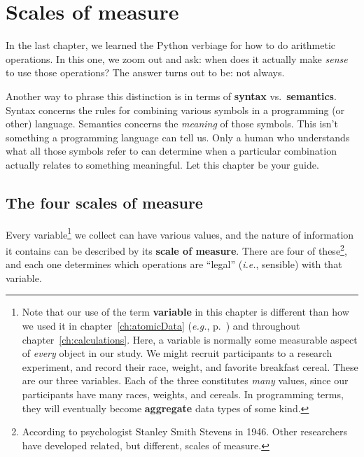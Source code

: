 


\chapter{Scales of measure}
\label{ch:scalesOfMeasure}

In the last chapter, we learned the Python verbiage for how to do arithmetic
operations. In this one, we zoom out and ask: when does it actually make
\textit{sense} to use those operations? The answer turns out to be: not always.

Another way to phrase this distinction is in terms of \textbf{syntax}
vs.~\textbf{semantics}. Syntax concerns the rules for combining various symbols
in a programming (or other) language. Semantics concerns the \textit{meaning}
of those symbols. This isn't something a programming language can tell us. Only
a human who understands what all those symbols refer to can determine when a
particular combination actually relates to something meaningful. Let this
chapter be your guide.

\section{The four scales of measure}

\label{variableDifferent}
Every variable\footnote{Note that our use of the term \textbf{variable} in this
chapter is different than how we used it in chapter~\ref{ch:atomicData}
(\textit{e.g.}, p.~\pageref{sec:envsAndVariables}) and throughout
chapter~\ref{ch:calculations}. Here, a variable is normally some measurable
aspect of \textit{every} object in our study. We might recruit participants to
a research experiment, and record their race, weight, and favorite breakfast
cereal. These are our three variables. Each of the three constitutes
\textit{many} values, since our participants have many races, weights, and
cereals. In programming terms, they will eventually become \textbf{aggregate} data types
of some kind.} we collect can have various values, and the nature of
information it contains can be described by its \textbf{scale of measure}.
There are four of these\footnote{According to psychologist Stanley Smith
Stevens in 1946. Other researchers have developed related, but different,
scales of measure.}, and each one determines which %
operations are ``legal'' (\textit{i.e.}, sensible) with that variable.

